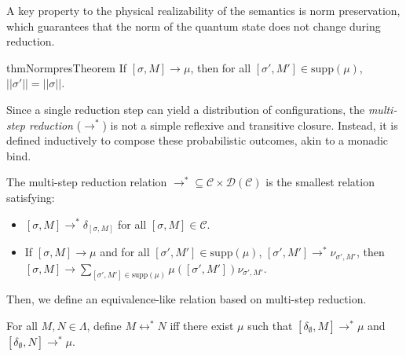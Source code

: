 A key property to the physical realizability of the semantics is norm preservation, which guarantees that the norm of the quantum state does not change during reduction.
\begin{restatable}{thm}{NormpresTheorem} \label{thm:norm-pres}
  If $[\sigma,M] \longrightarrow \mu$, then for all $[\sigma',M']\in\mathrm{supp}(\mu)$, $||\sigma'|| = ||\sigma||$.
\end{restatable}

Since a single reduction step can yield a distribution of configurations, the \textit{multi-step reduction} ($\longrightarrow^*$) is not a simple reflexive and transitive closure. Instead, it is defined inductively to compose these probabilistic outcomes, akin to a monadic bind.
\begin{dfn}
  The multi-step reduction relation $\longrightarrow^*\subseteq \mathcal{C}\times \mathcal{D}(\mathcal{C})$ is the smallest relation satisfying:
  \begin{itemize}
    \item $[\sigma,M] \longrightarrow^*\delta_{[\sigma,M]}$ for all $[\sigma,M]\in\mathcal{C}$.
    \item If $[\sigma,M] \longrightarrow \mu$ and for all $[\sigma',M']\in\mathrm{supp}(\mu)$, $[\sigma',M'] \longrightarrow^*\nu_{\sigma',M'}$, then $[\sigma,M] \longrightarrow\sum_{[\sigma',M']\in\mathrm{supp}(\mu)} \mu([\sigma',M'])\nu_{\sigma',M'}$.
  \end{itemize}
\end{dfn}

Then, we define an equivalence-like relation based on multi-step reduction.
\begin{dfn}
  For all $M, N \in \Lambda$, define $M \longleftrightarrow^* N$ iff
  there exist $\mu$ such that $[\delta_\emptyset, M] \longrightarrow^* \mu$ and $[\delta_\emptyset, N] \longrightarrow^* \mu$.
\end{dfn}

